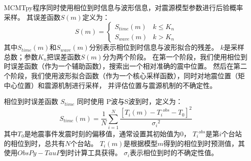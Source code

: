 MCMTpy程序同时使用相位到时信息与波形信息，对震源模型参数进行后验概率采样。
其误差函数$S(m)$定义为：
\begin{equation}
    S(m)=
    \begin{cases}
        S_{time}(m)   &  k \le K_n  \\
        S_{wave}(m)   &  k > K_n
    \end{cases}
\end{equation}
其中$S_{time}(m)$和$S_{wave}(m)$分别表示相位到时信息与波形拟合的残差。
$k$是采样总数；参数$K_n$把误差函数$S(m)$分为两个阶段。
在第一个阶段，我们使用相位到时误差函数（作为一个辅助函数），搜索出一个相对准确的震中位置。
然后在第二个阶段，我们使用波形拟合函数（作为一个核心采样函数），同时对地震位置（矩中心位置）和震源机制进行采样，
并评估位置与震源机制的不确定性。

相位到时误差函数 $S_{time}$ 同时使用 P波与S波到时，定义为：
\begin{equation}
    S_{time}(m) = \frac{1}{N} \sum_{i=1}^N \frac{{[T_i(m) - {T_i}^{obs} - T_0]}^2} {{\sigma_i}^2}
\end{equation}
其中$T_0$是地震事件发震时刻的偏移值，通常设置其初始值为0，
${T_i}^{obs}$是第$i$个台站的相位到时，总共有$N$个台站。
$T_i(m)$是根据模型$m$得到的相位到时预测值，其使用$ObsPy-TauP$到时计算工具获得\citep{Crotwell1999,Beyreuther2010}。
$\sigma_i$表示相位到时的不确定性值。

